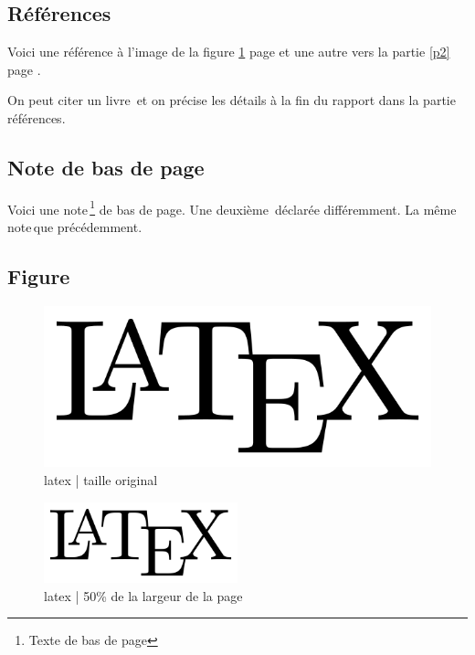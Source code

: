 %
\subsection{Références}

Voici une référence à l'image de la figure \ref{latex} page \pageref{latex} et une autre vers la partie \ref{p2} page \pageref{p2}.

On peut citer un livre\, et on précise les détails à la fin du rapport dans la partie références.


%
\subsection{Note de bas de page}

Voici une note\,\footnote{Texte de bas de page} de bas de page.
Une deuxième\,\footnotemark{} déclarée différemment.
La même note\,\footnotemark[\value{footnote}] que précédemment.



%
\subsection{Figure}

\begin{figure}[!ht]
    \center
    \includegraphics[]{./images/LaTeX_logo.png}
    \caption{latex | taille original}
    \label{latex}
\end{figure}

\begin{figure}[!ht]
    \center
    \includegraphics[width=0.5\textwidth]{./images/LaTeX_logo.png}
    \caption{latex | 50\% de la largeur de la page}
\end{figure}
